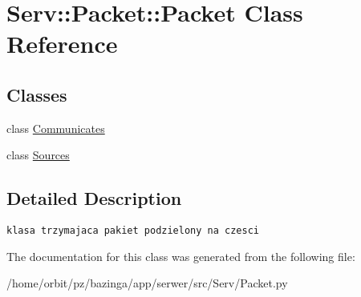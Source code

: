 \hypertarget{class_serv_1_1_packet_1_1_packet}{
\section{Serv::Packet::Packet Class Reference}
\label{class_serv_1_1_packet_1_1_packet}
}
\subsection*{Classes}
\begin{CompactItemize}
\item 
class \hyperlink{class_serv_1_1_packet_1_1_packet_1_1_communicates}{Communicates}
\item 
class \hyperlink{class_serv_1_1_packet_1_1_packet_1_1_sources}{Sources}
\end{CompactItemize}


\subsection{Detailed Description}


\footnotesize\begin{verbatim}
klasa trzymajaca pakiet podzielony na czesci

\end{verbatim}
\normalsize
 

The documentation for this class was generated from the following file:\begin{CompactItemize}
\item 
/home/orbit/pz/bazinga/app/serwer/src/Serv/Packet.py\end{CompactItemize}
